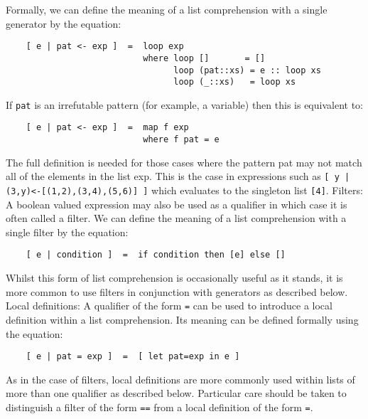      Formally, we can define the meaning of a list comprehension with a
     single generator by the equation:
\begin{verbatim}
    [ e | pat <- exp ]  =  loop exp
                           where loop []       = []
                                 loop (pat::xs) = e :: loop xs
                                 loop (_::xs)   = loop xs
\end{verbatim}
     If \verb"pat" is an irrefutable pattern (for example,  a  variable)  then
     this is equivalent to:
\begin{verbatim}
    [ e | pat <- exp ]  =  map f exp
                           where f pat = e
\end{verbatim}
     The full definition is needed for those cases  where  the  pattern
     pat may not match all of the elements in the list  exp.   This  is
     the case in expressions such as \verb"[ y | (3,y)<-[(1,2),(3,4),(5,6)] ]"
     which evaluates to the singleton list \verb"[4]".
\IT  Filters: A boolean  valued  expression  may  also  be  used  as  a
     qualifier in which case it is  often  called  a  filter.   We  can
     define the meaning of a list comprehension with a single filter by
     the equation:
\begin{verbatim}
    [ e | condition ]  =  if condition then [e] else []
\end{verbatim}
     Whilst this form of list comprehension is occasionally  useful  as
     it stands, it is more common to use filters  in  conjunction  with
     generators as described below.
\IT  Local definitions: A qualifier of the form  \verb"=" 
     can be used to
     introduce a local definition within  a  list  comprehension.   Its
     meaning can be defined formally using the equation:
\begin{verbatim}
    [ e | pat = exp ]  =  [ let pat=exp in e ]
\end{verbatim}
     As in the case of filters, local  definitions  are  more  commonly
     used within lists of more than one qualifier as  described  below.
     Particular care should be taken to distinguish  a  filter  of  the
     form \verb"==" 
     from a local definition of the form \verb"=".

